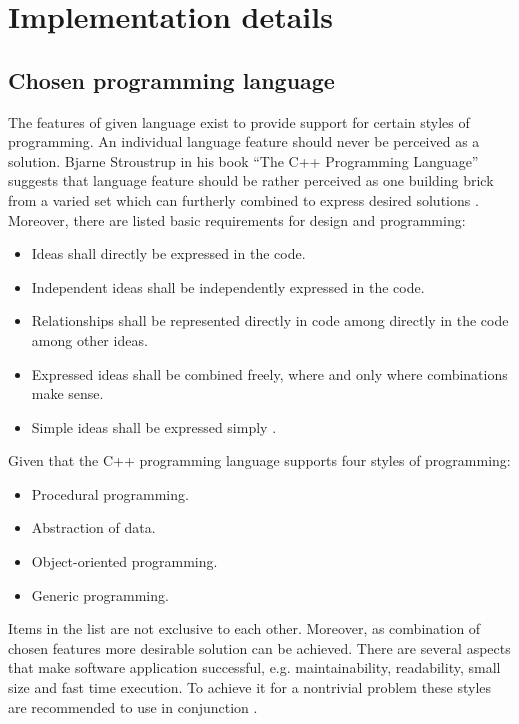 
\section{Implementation details}

\subsection{Chosen programming language}

The features of given language exist to provide support for certain styles of programming. An individual
language feature should never be perceived as a solution. Bjarne Stroustrup in his book ``The C++ Programming Language''
suggests that language feature should be rather perceived as one building brick from a varied set which can
furtherly combined to express desired solutions \cite{cpp_language_bjarne}. Moreover, there are listed
basic requirements for design and programming:
\begin{itemize}
    \item Ideas shall directly be expressed in the code.
    \item Independent ideas shall be independently expressed in the code.
    \item Relationships shall be represented directly in code among directly in the code among other ideas.
    \item Expressed ideas shall be combined freely, where and only where combinations make sense.
    \item Simple ideas shall be expressed simply \cite{cpp_language_bjarne}.
\end{itemize}

Given that the C++ programming language supports four styles of programming:
\begin{itemize}
    \item Procedural programming.
    \item Abstraction of data.
    \item Object-oriented programming.
    \item Generic programming.
\end{itemize}
Items in the list are not exclusive to each other. Moreover, as combination of chosen features
more desirable solution can be achieved. There are several aspects that make software application
successful, e.g. maintainability, readability, small size and fast time execution. To achieve it
for a nontrivial problem these styles are recommended to use in conjunction \cite{cpp_language_bjarne}.


